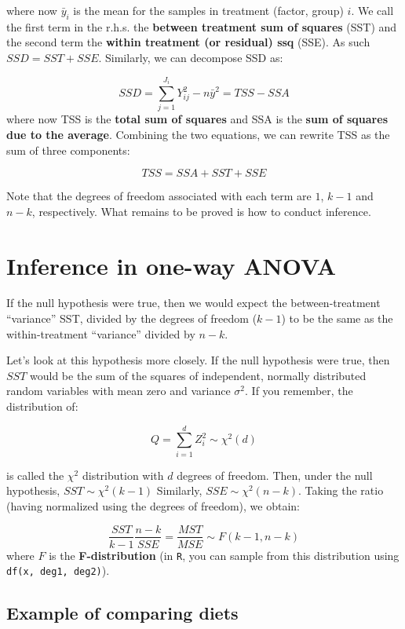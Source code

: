 \documentclass[
  letterpaper,
  DIV=11,
  numbers=noendperiod]{scrreprt}
\begin{document}
where now \(\bar{y}_i\) is the mean for the samples in treatment
(factor, group) \(i\). We call the first term in the r.h.s. the
\textbf{between treatment sum of squares} (SST) and the second term the
\textbf{within treatment (or residual) ssq} (SSE). As such
\(SSD = SST + SSE\). Similarly, we can decompose SSD as:

\[
SSD = \sum_{j = 1}^{J_{i}} Y_{ij}^2 - n \bar{y}^2 = TSS - SSA
\] where now TSS is the \textbf{total sum of squares} and SSA is the
\textbf{sum of squares due to the average}. Combining the two equations,
we can rewrite TSS as the sum of three components:

\[
TSS = SSA + SST + SSE
\]

Note that the degrees of freedom associated with each term are \(1\),
\(k-1\) and \(n-k\), respectively. What remains to be proved is how to
conduct inference.

\section{Inference in one-way ANOVA}\label{inference-in-one-way-anova}

If the null hypothesis were true, then we would expect the
between-treatment ``variance'' SST, divided by the degrees of freedom
(\(k-1\)) to be the same as the within-treatment ``variance'' divided by
\(n-k\).

Let's look at this hypothesis more closely. If the null hypothesis were
true, then \(SST\) would be the sum of the squares of independent,
normally distributed random variables with mean zero and variance
\(\sigma^2\). If you remember, the distribution of:

\[
Q = \sum_{i=1}^d Z_i^2 \sim \chi^2(d)
\]

is called the \(\chi^2\) distribution with \(d\) degrees of freedom.
Then, under the null hypothesis, \(SST \sim \chi^2(k-1)\) Similarly,
\(SSE \sim \chi^2(n-k)\). Taking the ratio (having normalized using the
degrees of freedom), we obtain:

\[
\frac{SST}{k-1} \frac{n-k}{SSE} = \frac{MST}{MSE} \sim F(k-1, n-k)
\] where \(F\) is the \textbf{F-distribution} (in \texttt{R}, you can
sample from this distribution using \texttt{df(x,\ deg1,\ deg2)}).

\subsection{Example of comparing
diets}\label{example-of-comparing-diets}
\end{document}
